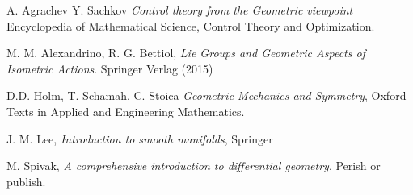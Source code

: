 \documentclass[11pt, reqno]{amsart}
\newcommand{\<}[0]{\langle}
\renewcommand{\>}[0]{\rangle}
\begin{document}
\begin{thebibliography}{99}






 A. Agrachev Y. Sachkov
\emph{Control theory from the Geometric viewpoint }
Encyclopedia of Mathematical Science, Control Theory and
Optimization.  

 M. M. Alexandrino,  R. G. Bettiol, 
\emph{Lie Groups and Geometric Aspects of Isometric Actions}. Springer Verlag  (2015)  


 D.D. Holm, T. Schamah, C. Stoica
\emph{Geometric Mechanics and Symmetry}, Oxford Texts 
in Applied and Engineering Mathematics.

 J. M. Lee, \emph{Introduction to smooth manifolds}, Springer 

 M. Spivak, 
\emph{A comprehensive introduction to differential geometry}, Perish or publish. 










	

\end{thebibliography}
\end{document}

